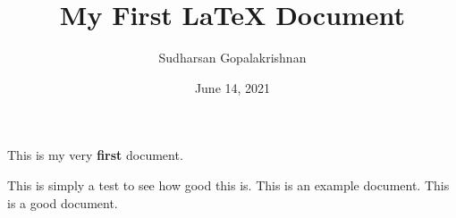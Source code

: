 \documentclass{article}
\title{My First \LaTeX{} Document}
\author{Sudharsan Gopalakrishnan}
\date{June 14, 2021}
\begin{document}
    \maketitle

    \begin{center}
    This is my very \textbf{first} document.
    \end{center}
    \newline
    This is simply a test to see how good this is.
    \newline
    This is an example document.
    \newline
    This is a good document.
\end{document}
